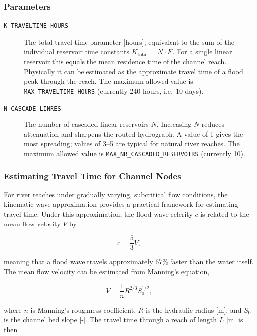 \documentclass[a4paper, 12pt]{report}
\begin{document}
	\subsubsection{Parameters}

	\begin{description}
		\item[\texttt{K\_TRAVELTIME\_HOURS}] The total travel time parameter [hours], equivalent
		to the sum of the individual reservoir time constants
		$K_\mathrm{total} = N \cdot K$. For a single linear reservoir this equals the
		mean residence time of the channel reach. Physically it can be estimated as the
		approximate travel time of a flood peak through the reach. The maximum allowed value
		is \texttt{MAX\_TRAVELTIME\_HOURS} (currently 240 hours, i.e.\ 10 days).
	
		\item[\texttt{N\_CASCADE\_LINRES}] The number of cascaded linear reservoirs $N$.
		Increasing $N$ reduces attenuation and sharpens the routed hydrograph. A value of
		1 gives the most spreading; values of 3--5 are typical for natural river reaches.
		The maximum allowed value is \texttt{MAX\_NR\_CASCADED\_RESERVOIRS} (currently 10).
	\end{description}

	
	\subsubsection{Estimating Travel Time for Channel Nodes}
	For river reaches under gradually varying, subcritical flow conditions, the kinematic
	wave approximation provides a practical framework for estimating travel time.
	Under this approximation, the flood wave celerity $c$ is related to the mean flow
	velocity $V$ by
	
	\begin{equation}
		c = \frac{5}{3} V,
	\end{equation}
	
	meaning that a flood wave travels approximately 67\% faster than the water itself.
	The mean flow velocity can be estimated from Manning's equation,
	
	\begin{equation}
		V = \frac{1}{n} R^{2/3} S_0^{1/2},
	\end{equation}
	
	where $n$ is Manning's roughness coefficient, $R$ is the hydraulic radius [m], and
	$S_0$ is the channel bed slope [-]. The travel time through a reach of length $L$ [m]
	is then
	
\end{document}
